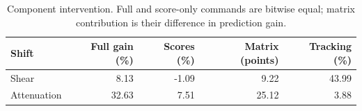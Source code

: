 \begin{table}[tbp]
\centering\small
\caption{Component intervention. Full and score-only commands are bitwise equal; matrix contribution is their difference in prediction gain.}
\label{tab:roles}
\begin{tabular}{@{}lrrrr@{}}
\toprule
Shift & Full gain (\%) & Scores (\%) & Matrix (points) & Tracking (\%) \\
\midrule
Shear & 8.13 & -1.09 & 9.22 & 43.99 \\
Attenuation & 32.63 & 7.51 & 25.12 & 3.88 \\
\bottomrule
\end{tabular}
\end{table}
